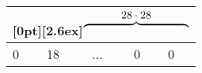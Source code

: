 \begin{tabular}{lllll}
\multicolumn{5}{c}{\enspace\raisebox{-3.3ex}[0pt][2.6ex]{$ \overbrace{\vphantom{-}\hspace{9.5em}}^{\textstyle 28\cdot28}$}}                                                                                                        \\ \hline
\multicolumn{1}{|l|}{0} & \multicolumn{1}{l|}{18} & \multicolumn{1}{l|}{...} & \multicolumn{1}{l|}{0} & \multicolumn{1}{l|}{0} \\ \hline
\end{tabular}
